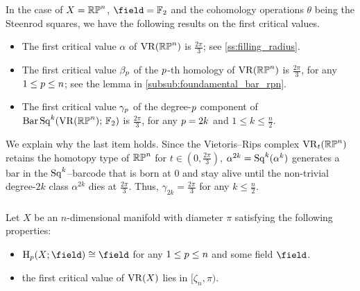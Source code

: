 \medskip\example
In the case of $X = \mathbb{RP}^n$, $\field = \Ftwo$ and the cohomology operations $\theta$ being the Steenrod squares, we have the following results on the first critical values.
\begin{itemize}
    \item  The first critical value $\alpha$ of $\operatorname{VR}(\mathbb{RP}^n)$ is $\tfrac{2\pi}{3}$; see \cref{ss:filling_radius}.
    \item The first critical value $\beta_p$ of the $p$-th homology of $\operatorname{VR}(\mathbb{RP}^n)$ is $\tfrac{2\pi}{3}$, for any $1 \leq p \leq n$; see the lemma in \cref{subsub:foundamental_bar_rpn}.
    \item The first critical value $\gamma_p$ of the degree-$p$ component of $\operatorname{Bar}\operatorname{Sq}^{k}(\operatorname{VR}(\mathbb{RP}^n);\,{\mathbb{F}_2})$ is $\tfrac{2\pi}{3}$, for any $p = 2k$ and $1 \leq k \leq \tfrac{n}{2}$. 
\end{itemize}
We explain why the last item holds.
Since the Vietoris--Rips complex $\operatorname{VR}_t(\mathbb{RP}^n)$ retains the homotopy type of $\mathbb{RP}^n$ for $t \in (0,\tfrac{2\pi}{3})$, $\alpha^{2k}=\operatorname{Sq}^k(\alpha^k)$ generates a bar in the $\operatorname{Sq}^k$--barcode that is born at $0$ and stay alive until the non-trivial degree-$2k$ class $\alpha^{2k}$ dies at $\tfrac{2\pi}{3}$.
Thus, $\gamma_{2k} = \tfrac{2\pi}{3}$ for any $k \leq \tfrac{n}{2}$.

\subsubsection{}
\label{subsub:general_barcodes}

Let $X$ be an $n$-dimensional manifold with diameter $\pi$ satisfying the following properties:
\begin{itemize}
    \item $\mathrm{H}_\degp (X; \field)\cong \field$ for any $1\leq p\leq n$ and some field $\field$.
    \item the first critical value of $\operatorname{VR}(X)$ lies in $[\zeta_n, \pi)$.
\end{itemize}

